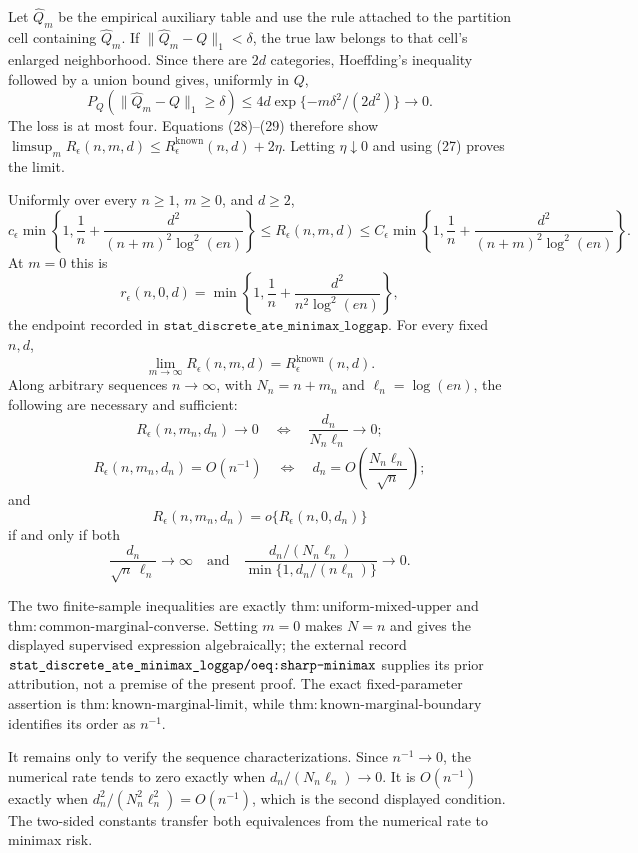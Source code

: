 Let \(\widehat Q_m\) be the empirical auxiliary table and use the rule attached to the partition cell containing \(\widehat Q_m\).  If \(\|\widehat Q_m-Q\|_1<\delta\), the true law belongs to that cell's enlarged neighborhood.  Since there are \(2d\) categories, Hoeffding's inequality followed by a union bound gives, uniformly in \(Q\),
\[
 P_Q(\|\widehat Q_m-Q\|_1\ge\delta)
 \le4d\exp\{-m\delta^2/(2d^2)\}\longrightarrow0. \tag{29}
\]
The loss is at most four.  Equations (28)--(29) therefore show \(\limsup_mR_\epsilon(n,m,d)\le R_\epsilon^{\mathrm{known}}(n,d)+2\eta\).  Letting \(\eta\downarrow0\) and using (27) proves the limit.

Uniformly over every \(n\ge1\), \(m\ge0\), and \(d\ge2\),
\[
 c_\epsilon\min\!\left\{1,\frac1n+\frac{d^2}{(n+m)^2\log^2(en)}\right\}
 \le R_\epsilon(n,m,d)\le
 C_\epsilon\min\!\left\{1,\frac1n+\frac{d^2}{(n+m)^2\log^2(en)}\right\}.
\]
At \(m=0\) this is
\[
 r_\epsilon(n,0,d)=\min\!\left\{1,\frac1n+\frac{d^2}{n^2\log^2(en)}\right\},
\]
the endpoint recorded in \(\texttt{stat\_discrete\_ate\_minimax\_loggap}\).  For every fixed \(n,d\),
\[
 \lim_{m\to\infty}R_\epsilon(n,m,d)=R_\epsilon^{\mathrm{known}}(n,d).
\]
Along arbitrary sequences \(n\to\infty\), with \(N_n=n+m_n\) and \(\ell_n=\log(en)\), the following are necessary and sufficient:
\[
 R_\epsilon(n,m_n,d_n)\to0
 \quad\Longleftrightarrow\quad
 \frac{d_n}{N_n\ell_n}\to0;
\]
\[
 R_\epsilon(n,m_n,d_n)=O(n^{-1})
 \quad\Longleftrightarrow\quad
 d_n=O\!\left(\frac{N_n\ell_n}{\sqrt n}\right);
\]
and
\[
 R_\epsilon(n,m_n,d_n)=o\{R_\epsilon(n,0,d_n)\}
\]
if and only if both
\[
 \frac{d_n}{\sqrt n\,\ell_n}\to\infty
 \quad\text{and}\quad
 \frac{d_n/(N_n\ell_n)}{\min\{1,d_n/(n\ell_n)\}}\to0.
\]

The two finite-sample inequalities are exactly \(\mathrm{thm:uniform\mbox{-}mixed\mbox{-}upper}\) and \(\mathrm{thm:common\mbox{-}marginal\mbox{-}converse}\).  Setting \(m=0\) makes \(N=n\) and gives the displayed supervised expression algebraically; the external record \(\texttt{stat\_discrete\_ate\_minimax\_loggap/oeq:sharp\mbox{-}minimax}\) supplies its prior attribution, not a premise of the present proof.  The exact fixed-parameter assertion is \(\mathrm{thm:known\mbox{-}marginal\mbox{-}limit}\), while \(\mathrm{thm:known\mbox{-}marginal\mbox{-}boundary}\) identifies its order as \(n^{-1}\).

It remains only to verify the sequence characterizations.  Since \(n^{-1}\to0\), the numerical rate tends to zero exactly when \(d_n/(N_n\ell_n)\to0\).  It is \(O(n^{-1})\) exactly when \(d_n^2/(N_n^2\ell_n^2)=O(n^{-1})\), which is the second displayed condition.  The two-sided constants transfer both equivalences from the numerical rate to minimax risk.

